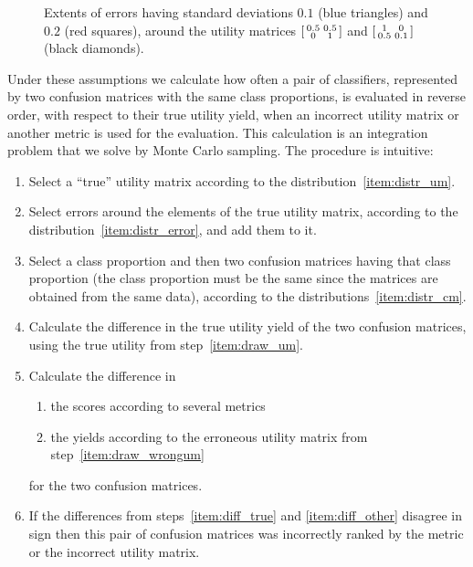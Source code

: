 \documentclass[\ifafour a4paper,12pt,\else a5paper,10pt,\fi%
onecolumn,oneside,article,%
british%
]{memoir}
\theoremstyle{remark}
\theoremstyle{innote}
\renewcommand*{\|}[1][]{\nonscript\:#1\vert\nonscript\:\mathopen{}}
\begin{document}
\begin{figure}[t]
{    \caption{Extents of errors having standard deviations $0.1$ ({\color{mypurpleblue}blue triangles}) and $0.2$ ({\color{myred}red squares}), around the utility matrices $\begin{bsmallmatrix} 0.5&0.5\\0&1 \end{bsmallmatrix}$ and $\begin{bsmallmatrix} 1&0\\0.5&0.1 \end{bsmallmatrix}$ (black diamonds).}
    \label{fig:error_distr_um}}
\end{figure}

Under these assumptions we calculate how often a pair of classifiers, represented by two confusion matrices with the same class proportions, is evaluated in reverse order, with respect to their true utility yield, when an incorrect utility matrix or another metric is used for the evaluation. This calculation is an integration problem that we solve by Monte Carlo sampling. The procedure is intuitive:
\begin{enumerate}[label=\arabic*.,ref=\arabic*]
\item\label{item:draw_um} Select a \enquote{true} utility matrix according to the distribution~\ref{item:distr_um}.
\item\label{item:draw_wrongum} Select errors around the elements of the true utility matrix, according to the distribution~\ref{item:distr_error}, and add them to it.
\item\label{item:draw_cm} Select a class proportion and then two confusion matrices having that class proportion (the class proportion must be the same since the matrices are obtained from the same data), according to the distributions~\ref{item:distr_cm}.
\item\label{item:diff_true} Calculate the difference in the true utility yield of the two confusion matrices, using the true utility from step~\ref{item:draw_um}.
\item\label{item:diff_other} Calculate the difference in
  \begin{enumerate}[label=\theenumi\alph*.]
  \item the scores according to several metrics
  \item the yields according to the erroneous utility matrix from step~\ref{item:draw_wrongum}
  \end{enumerate}
for the two confusion matrices.
\item If the differences from steps~\ref{item:diff_true} and \ref{item:diff_other} disagree in sign then this pair of confusion matrices was incorrectly ranked by the metric or the incorrect utility matrix.
\end{enumerate}
\end{document}
